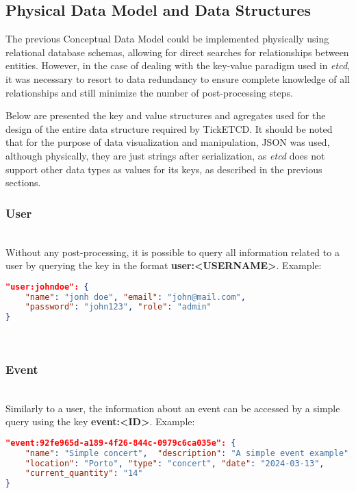 \documentclass[screen,review]{acmart}
\begin{document}
\subsection{Physical Data Model and Data Structures}
The previous Conceptual Data Model could be implemented physically using relational database schemas, allowing for direct searches for relationships between entities. However, in the case of dealing with the key-value paradigm used in \textit{etcd}, it was necessary to resort to data redundancy to ensure complete knowledge of all relationships and still minimize the number of post-processing steps.

Below are presented the key and value structures and agregates used for the design of the entire data structure required by TickETCD. It should be noted that for the purpose of data visualization and manipulation, JSON was used, although physically, they are just strings after serialization, as \textit{etcd} does not support other data types as values for its keys, as described in the previous sections. \\

\subsubsection{User}~\\
Without any post-processing, it is possible to query all information related to a user by querying the key in the format \textbf{user:<USERNAME>}. Example:

\begin{lstlisting}[language=json]
"user:johndoe": { 
    "name": "jonh doe", "email": "john@mail.com", 
    "password": "john123", "role": "admin"
}
\end{lstlisting}
\newline
\\ 
\subsubsection{Event}~\\
Similarly to a user, the information about an event can be accessed by a simple query using the key \textbf{event:<ID>}. Example:

\begin{lstlisting}[language=json]
"event:92fe965d-a189-4f26-844c-0979c6ca035e": {
    "name": "Simple concert",  "description": "A simple event example", 
    "location": "Porto", "type": "concert", "date": "2024-03-13",
    "current_quantity": "14"
}
\end{lstlisting}\\
\end{document}
